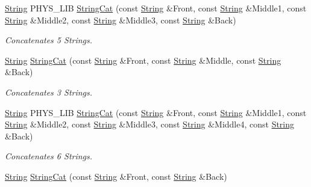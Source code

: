 \begin{DoxyCompactItemize}
\hyperlink{namespacephys_aa03900411993de7fbfec4789bc1d392e}{String} PHYS\_\-LIB \hyperlink{namespacephys_ae78c97cc3fea1bc4cb28ff77e98f4e71}{StringCat} (const \hyperlink{namespacephys_aa03900411993de7fbfec4789bc1d392e}{String} \&Front, const \hyperlink{namespacephys_aa03900411993de7fbfec4789bc1d392e}{String} \&Middle1, const \hyperlink{namespacephys_aa03900411993de7fbfec4789bc1d392e}{String} \&Middle2, const \hyperlink{namespacephys_aa03900411993de7fbfec4789bc1d392e}{String} \&Middle3, const \hyperlink{namespacephys_aa03900411993de7fbfec4789bc1d392e}{String} \&Back)
\begin{DoxyCompactList}\small\item\em Concatenates 5 Strings. \item\end{DoxyCompactList}\item 
\hyperlink{namespacephys_aa03900411993de7fbfec4789bc1d392e}{String} \hyperlink{namespacephys_a63b5574e497344727dfb4e244511f2fb}{StringCat} (const \hyperlink{namespacephys_aa03900411993de7fbfec4789bc1d392e}{String} \&Front, const \hyperlink{namespacephys_aa03900411993de7fbfec4789bc1d392e}{String} \&Middle, const \hyperlink{namespacephys_aa03900411993de7fbfec4789bc1d392e}{String} \&Back)
\begin{DoxyCompactList}\small\item\em Concatenates 3 Strings. \item\end{DoxyCompactList}\item 
\hyperlink{namespacephys_aa03900411993de7fbfec4789bc1d392e}{String} PHYS\_\-LIB \hyperlink{namespacephys_abf6b30d4f424f33ee4c74d1cb6eca109}{StringCat} (const \hyperlink{namespacephys_aa03900411993de7fbfec4789bc1d392e}{String} \&Front, const \hyperlink{namespacephys_aa03900411993de7fbfec4789bc1d392e}{String} \&Middle1, const \hyperlink{namespacephys_aa03900411993de7fbfec4789bc1d392e}{String} \&Middle2, const \hyperlink{namespacephys_aa03900411993de7fbfec4789bc1d392e}{String} \&Middle3, const \hyperlink{namespacephys_aa03900411993de7fbfec4789bc1d392e}{String} \&Middle4, const \hyperlink{namespacephys_aa03900411993de7fbfec4789bc1d392e}{String} \&Back)
\begin{DoxyCompactList}\small\item\em Concatenates 6 Strings. \item\end{DoxyCompactList}\item 
\hyperlink{namespacephys_aa03900411993de7fbfec4789bc1d392e}{String} \hyperlink{namespacephys_ae057253f75738c79bc5fdb5f1c5410de}{StringCat} (const \hyperlink{namespacephys_aa03900411993de7fbfec4789bc1d392e}{String} \&Front, const \hyperlink{namespacephys_aa03900411993de7fbfec4789bc1d392e}{String} \&Back)

\end{DoxyCompactItemize}
